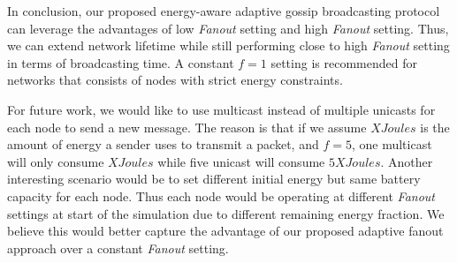 \documentclass[onehalf,11pt]{beavtex}
\begin{document}
In conclusion, our proposed energy-aware adaptive gossip broadcasting protocol can leverage the advantages of low \emph{Fanout} setting and high \emph{Fanout} setting. Thus, we can extend network lifetime while still performing close to high \emph{Fanout} setting in terms of broadcasting time. A constant $f=1$ setting is recommended for networks that consists of nodes with strict energy constraints. 

For future work, we would like to use multicast instead of multiple unicasts for each node to send a new message. The reason is that if we assume $X Joules$ is the amount of energy a sender uses to transmit a packet, and $f=5$, one multicast will only consume $X Joules$ while five unicast will consume $5X Joules$. Another interesting scenario would be to set different initial energy but same battery capacity for each node. Thus each node would be operating at different \emph{Fanout} settings at start of the simulation due to different remaining energy fraction. We believe this would better capture the advantage of our proposed adaptive fanout approach over a constant \emph{Fanout} setting.



%
%





\end{document}

